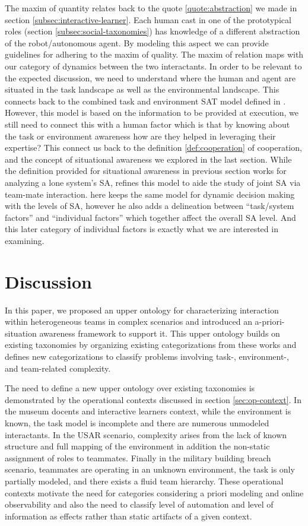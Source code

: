 \documentclass[letterpaper, 10 pt, conference]{ieeeconf}  %
\theoremstyle{definition}
\begin{document}
The maxim of quantity relates back to the quote \ref{quote:abstraction} we made in section \ref{subsec:interactive-learner}.
Each human cast in one of the prototypical roles (section \ref{subsec:social-taxonomies}) has knowledge of a different abstraction of the robot/autonomous agent.
By modeling this aspect we can provide guidelines for adhering to the maxim of quality.
The maxim of relation maps with our category of dynamics between the two interactants.
In order to be relevant to the expected discussion, we need to understand where the human and agent are situated in the task landscape as well as the environmental landscape.
This connects back to the combined task and environment SAT model defined in \cite{chen2014situation}.
However, this model is based on the information to be provided at execution, we still need to connect this with a human factor which is that by knowing about the task or environment awareness how are they helped in leveraging their expertise?
This connect us back to the definition \ref{def:cooperation} of cooperation, and the concept of situational awareness we explored in the last section.
While the definition provided for situational awareness in previous section works for analyzing a lone system's SA, \cite{Endsley1995} refines this model to aide the study of joint SA via team-mate interaction.
\citeauthor{Endsley1995} here keeps the same model for dynamic decision making with the levels of SA, however he also adds a delineation between ``task/system factors'' and ``individual factors'' which together affect the overall SA level.
And this later category of individual factors is exactly what we are interested in examining.

\section{Discussion}
\label{sec:discussion}
In this paper, we proposed an upper ontology for characterizing interaction within heterogeneous teams in complex scenarios and introduced an a-priori-situation awareness framework to support it. This upper ontology builds on existing taxonomies by organizing existing categorizations from these works and defines new categorizations to classify problems involving task-, environment-, and team-related complexity.

The need to define a new upper ontology over existing taxonomies is demonstrated by the operational contexts discussed in section \ref{sec:op-context}.  In the museum docents and interactive learners context, while the environment is known, the task model is incomplete and there are numerous unmodeled interactants. In the USAR scenario, complexity arises from the lack of known structure and full mapping of the environment in addition the non-static assignment of roles to teammates. Finally in the military building breach scenario, teammates are operating in an unknown environment, the task is only partially modeled, and there exists a fluid team hierarchy. These operational contexts motivate the need for categories considering a priori modeling and online observability and also the need to classify level of automation and level of information as effects rather than static artifacts of a given context. 
\end{document}
